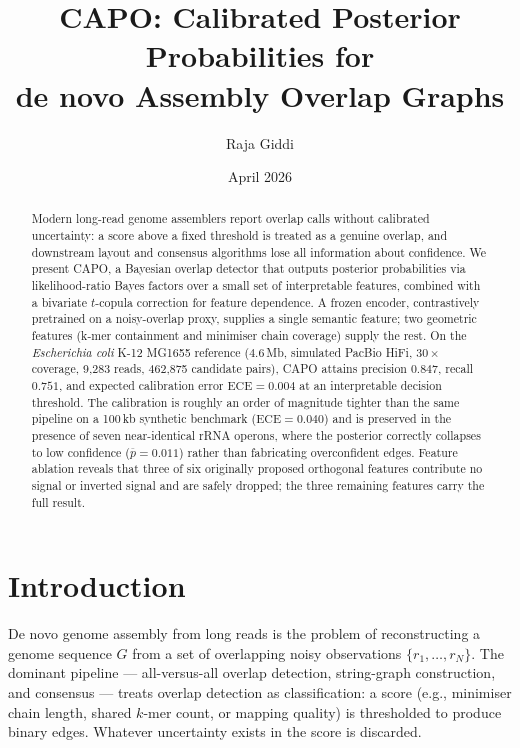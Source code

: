 \documentclass[11pt]{article}
\title{CAPO: Calibrated Posterior Probabilities for\\
de novo Assembly Overlap Graphs}
\author{Raja Giddi}
\affil{Independent}
\date{April 2026}
\begin{document}
\maketitle

\begin{abstract}
Modern long-read genome assemblers report overlap calls without calibrated
uncertainty: a score above a fixed threshold is treated as a genuine overlap,
and downstream layout and consensus algorithms lose all information about
confidence. We present CAPO, a Bayesian overlap detector that outputs posterior
probabilities via likelihood-ratio Bayes factors over a small set of
interpretable features, combined with a bivariate $t$-copula correction for
feature dependence. A frozen encoder, contrastively pretrained on a
noisy-overlap proxy, supplies a single semantic feature; two geometric
features (k-mer containment and minimiser chain coverage) supply the rest.
On the \textit{Escherichia coli} K-12 MG1655 reference ($4.6$\,Mb, simulated
PacBio HiFi, 30\,$\times$ coverage, 9{,}283 reads, 462{,}875 candidate pairs),
CAPO attains precision $0.847$, recall $0.751$, and expected calibration
error $\mathrm{ECE} = 0.004$ at an interpretable decision threshold. The
calibration is roughly an order of magnitude tighter than the same pipeline
on a 100\,kb synthetic benchmark ($\mathrm{ECE}=0.040$) and is preserved in
the presence of seven near-identical rRNA operons, where the posterior
correctly collapses to low confidence ($\overline{p}=0.011$) rather than
fabricating overconfident edges. Feature ablation reveals that three of six
originally proposed orthogonal features contribute no signal or inverted
signal and are safely dropped; the three remaining features carry the full
result.
\end{abstract}

\section{Introduction}

De novo genome assembly from long reads is the problem of reconstructing a
genome sequence $G$ from a set of overlapping noisy observations
$\{r_1, \ldots, r_N\}$. The dominant pipeline --- all-versus-all overlap
detection, string-graph construction, and consensus \citep{myers2005fragment,
li2016minimap, cheng2021hifiasm} --- treats overlap detection as
classification: a score (e.g., minimiser chain length, shared $k$-mer count,
or mapping quality) is thresholded to produce binary edges. Whatever
uncertainty exists in the score is discarded.
\end{document}
